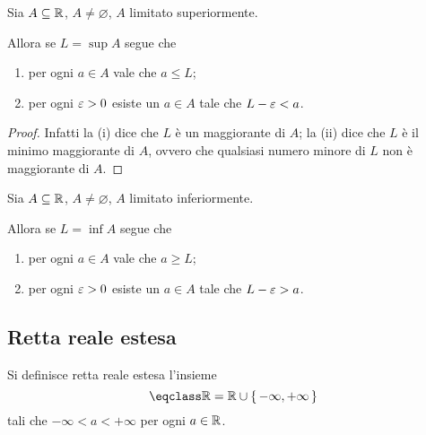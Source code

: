 \begin{proposition}
     \label{prop:caratt_sup}
    Sia $A \subseteq \mathbb{R}$, $A \neq \varnothing$, $A$ limitato superiormente.

    Allora se $L = \sup A$ segue che \begin{enumerate}[label={(\roman*)}, ref={caratterizzazione del sup: (\roman*)}]
        \item \label{prop:caratt_sup:magg} per ogni $a \in A$ vale che $a \leq L$;
        \item \label{prop:caratt_sup:min_magg} per ogni $\varepsilon > 0$ esiste un $a \in A$ tale che $L - \varepsilon < a$.
    \end{enumerate}
\end{proposition}
\begin{proof}
    Infatti la (i) dice che $L$ è un maggiorante di $A$; la (ii) dice che $L$ è il minimo maggiorante di $A$, ovvero che qualsiasi numero minore di $L$ non è maggiorante di $A$.
\end{proof}

\begin{proposition}
     \label{prop:caratt_inf}
    Sia $A \subseteq \mathbb{R}$, $A \neq \varnothing$, $A$ limitato inferiormente.

    Allora se $L = \inf A$ segue che \begin{enumerate}[label={(\roman*)}, ref={caratterizzazione dell'inf: (\roman*)}]
        \item \label{prop:caratt_inf:magg} per ogni $a \in A$ vale che $a \geq L$;
        \item \label{prop:caratt_inf:min_magg} per ogni $\varepsilon > 0$ esiste un $a \in A$ tale che $L - \varepsilon > a$.
    \end{enumerate}
\end{proposition}

\subsection{Retta reale estesa}

\begin{definition}
    Si definisce retta reale estesa l'insieme \[
        \closure{\R} = \R \union \set{-\infty, +\infty}    
    \] tali che $-\infty < a < +\infty$ per ogni $a \in \mathbb{R}$.
\end{definition}

